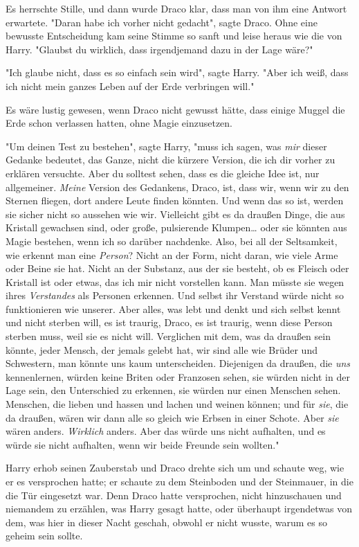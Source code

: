 {Es herrschte Stille, und dann wurde Draco klar, dass man von ihm eine Antwort erwartete. "Daran habe ich vorher nicht gedacht", sagte Draco. Ohne eine bewusste Entscheidung kam seine Stimme so sanft und leise heraus wie die von Harry. "Glaubst du wirklich, dass irgendjemand dazu in der Lage wäre?"

"Ich glaube nicht, dass es so einfach sein wird", sagte Harry. "Aber ich weiß, dass ich nicht mein ganzes Leben auf der Erde verbringen will."

Es wäre lustig gewesen, wenn Draco nicht gewusst hätte, dass einige Muggel die Erde schon verlassen hatten, ohne Magie einzusetzen.

"Um deinen Test zu bestehen", sagte Harry, "muss ich sagen, was \emph{mir} dieser Gedanke bedeutet, das Ganze, nicht die kürzere Version, die ich dir vorher zu erklären versuchte. Aber du solltest sehen, dass es die gleiche Idee ist, nur allgemeiner. \emph{Meine} Version des Gedankens, Draco, ist, dass wir, wenn wir zu den Sternen fliegen, dort andere Leute finden könnten. Und wenn das so ist, werden sie sicher nicht so aussehen wie wir. Vielleicht gibt es da draußen Dinge, die aus Kristall gewachsen sind, oder große, pulsierende Klumpen… oder sie könnten aus Magie bestehen, wenn ich so darüber nachdenke. Also, bei all der Seltsamkeit, wie erkennt man eine \emph{Person}? Nicht an der Form, nicht daran, wie viele Arme oder Beine sie hat. Nicht an der Substanz, aus der sie besteht, ob es Fleisch oder Kristall ist oder etwas, das ich mir nicht vorstellen kann. Man müsste sie wegen ihres \emph{Verstandes} als Personen erkennen. Und selbst ihr Verstand würde nicht so funktionieren wie unserer. Aber alles, was lebt und denkt und sich selbst kennt und nicht sterben will, es ist traurig, Draco, es ist traurig, wenn diese Person sterben muss, weil sie es nicht will. Verglichen mit dem, was da draußen sein könnte, jeder Mensch, der jemals gelebt hat, wir sind alle wie Brüder und Schwestern, man könnte uns kaum unterscheiden. Diejenigen da draußen, die \emph{uns} kennenlernen, würden keine Briten oder Franzosen sehen, sie würden nicht in der Lage sein, den Unterschied zu erkennen, sie würden nur einen Menschen sehen. Menschen, die lieben und hassen und lachen und weinen können; und für \emph{sie}, die da draußen, wären wir dann alle so gleich wie Erbsen in einer Schote. Aber \emph{sie} wären anders. \emph{Wirklich} anders. Aber das würde uns nicht aufhalten, und es würde sie nicht aufhalten, wenn wir beide Freunde sein wollten."

Harry erhob seinen Zauberstab und Draco drehte sich um und schaute weg, wie er es versprochen hatte; er schaute zu dem Steinboden und der Steinmauer, in die die Tür eingesetzt war. Denn Draco hatte versprochen, nicht hinzuschauen und niemandem zu erzählen, was Harry gesagt hatte, oder überhaupt irgendetwas von dem, was hier in dieser Nacht geschah, obwohl er nicht wusste, warum es so geheim sein sollte.

}
